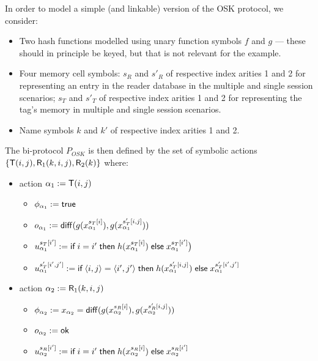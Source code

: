 \begin{example}[OSK]
  \label{ex:osk-bi-process}
  In order to model a simple (and linkable) version of the OSK protocol,
  we consider:
  \begin{itemize}
    \item Two hash functions modelled using unary function symbols
      $f$ and $g$ --- these should in principle be keyed, but that is
      not relevant for the example.
    \item Four memory cell symbols:
      $s_R$ and $s'_R$ of respective index arities 1 and 2 for representing
      an entry in the reader database in the multiple and single session
      scenarios;
      $s_T$ and $s'_T$ of respective index arities 1 and 2 for representing
      the tag's memory in multiple and single session scenarios.
    \item Name symbols $k$ and $k'$ of respective index arities 1 and 2.
  \end{itemize}
  The bi-protocol $P_{OSK}$ is then defined by
  the set of symbolic actions $\{\textsf{T}(i,j),\textsf{R}_1(k,i,j),\textsf{R}_2(k)\}$ where:
    \begin{itemize}
      \item action $\alpha_1 := \textsf{T}(i,j)$
        \begin{itemize}
          \item $\phi_{\alpha_1} := \textsf{true}$
          \item $o_{\alpha_1} := \mathsf{diff}(g(x_{\alpha_1}^{s_T[i]}),g(x_{\alpha_1}^{s'_T[i,j]}))$
          \item $u_{\alpha_1}^{s_T[i']} :=
              \textsf{if}\; i=i' \;\textsf{then}\; h(x_{\alpha_1}^{s_T[i]})
              \;\textsf{else}\; x_{\alpha_1}^{s_T[i']}
            \bigr)$
          \item $u_{\alpha_1}^{s'_T[i',j']} :=
              \textsf{if}\; \langle i,j \rangle = \langle i',j' \rangle
              \;\textsf{then}\; h(x_{\alpha_1}^{s'_T[i,j]})
              \;\textsf{else}\; x_{\alpha_1}^{s'_T[i',j']}$
        \end{itemize}
      \item action $\alpha_2 := \textsf{R}_1(k,i,j)$
        \begin{itemize}
          \item $\phi_{\alpha_2} := x_{\alpha_2} = \mathsf{diff}(g(x_{\alpha_2}^{s_R[i]}),g(x_{\alpha_2}^{s'_R[i,j]}))$
          \item $o_{\alpha_2} := \mathsf{ok}$
          \item $u_{\alpha_2}^{s_R[i']} :=
            \textsf{if}\; i=i' \;\textsf{then}\;
            h(x_{\alpha_2}^{s_R[i]})
            \;\textsf{else}\; x_{\alpha_2}^{s_R[i']}$

\end{itemize}
\end{itemize}
\end{example}
